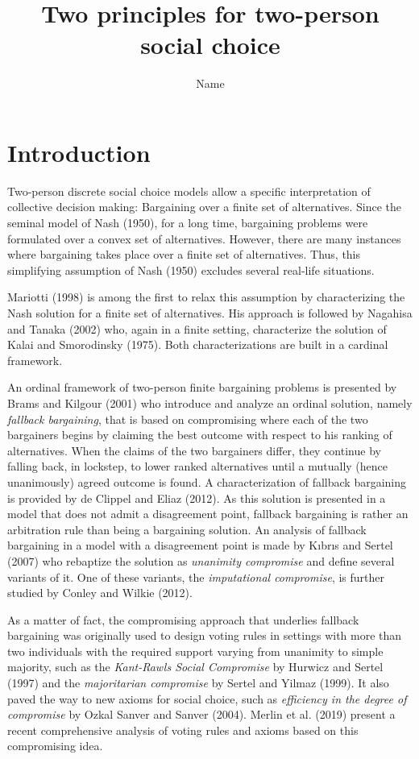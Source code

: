 \documentclass[version=3.21, pagesize, twoside=off, bibliography=totoc, DIV=calc, fontsize=12pt, a4paper]{scrartcl}
\title{Two principles for two-person social choice}
\author{Name}
\affil{Université Paris-Dauphine, PSL Research University, CNRS, LAMSADE, 75016 PARIS, FRANCE\\
}
\begin{document}
\maketitle

\section{Introduction}
\label{sec:intro}

Two-person discrete social choice models allow a specific interpretation of collective decision making: Bargaining over a finite set of alternatives. Since the seminal model of Nash (1950), for a long time, bargaining problems were formulated over a convex set of alternatives. However, there are many instances where bargaining takes place over a finite set of alternatives. Thus, this simplifying assumption of Nash (1950) excludes several real-life situations. 

Mariotti (1998) is among the first to relax this assumption by characterizing the Nash solution for a finite set of alternatives. His approach is followed by Nagahisa and Tanaka (2002) who, again in a finite setting, characterize the solution of Kalai and Smorodinsky (1975). Both characterizations are built in a cardinal framework. 
 
An ordinal framework of two-person finite bargaining problems is presented by Brams and Kilgour (2001) who introduce and analyze an ordinal solution, namely \textit{fallback bargaining}, that is based on compromising where each of the two bargainers begins by claiming the best outcome with respect to his ranking of alternatives. When the claims of the two bargainers differ, they continue by falling back, in lockstep, to lower ranked alternatives until a mutually (hence unanimously) agreed outcome is found. A characterization of fallback bargaining is provided by de Clippel and Eliaz (2012). As this solution is presented in a model that does not admit a disagreement point, fallback bargaining is rather an arbitration rule than being a bargaining solution. An analysis of fallback bargaining in a model with a disagreement point is made by Kıbrıs and Sertel (2007) who rebaptize the solution as \textit{unanimity compromise} and define several variants of it. One of these variants, the \textit{imputational compromise}, is further studied by Conley and Wilkie (2012).
 
As a matter of fact, the compromising approach that underlies fallback bargaining was originally used to design voting rules in settings with more than two individuals with the required support varying from unanimity to simple majority, such as the \textit{Kant-Rawls Social Compromise} by Hurwicz and Sertel (1997) and the \textit{majoritarian compromise} by Sertel and Yilmaz (1999). It also paved the way to new axioms for social choice, such as \textit{efficiency in the degree of compromise} by Ozkal Sanver and Sanver (2004).  Merlin et al. (2019) present a recent comprehensive analysis of voting rules and axioms based on this compromising idea.
 
\end{document}
